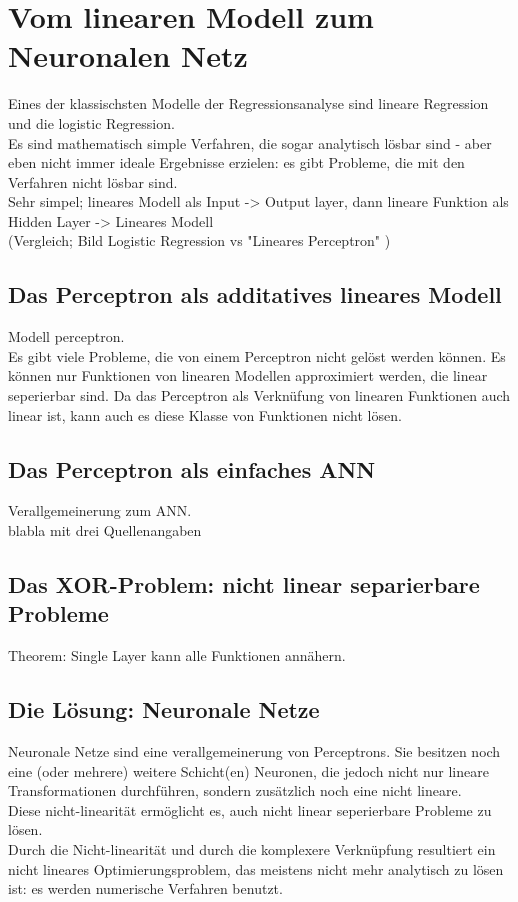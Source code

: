﻿\section{Vom linearen Modell zum Neuronalen Netz}
Eines der klassischsten Modelle der Regressionsanalyse sind lineare Regression und die logistic Regression. \\

Es sind mathematisch simple Verfahren, die sogar analytisch lösbar sind - aber eben nicht immer ideale Ergebnisse erzielen: es gibt Probleme, die mit den Verfahren nicht lösbar sind. 
\\


Sehr simpel; lineares Modell als Input -> Output layer,
dann lineare Funktion als Hidden Layer -> Lineares Modell \\
(Vergleich; Bild Logistic Regression vs "Lineares Perceptron" )

\subsection{Das Perceptron als additatives lineares Modell}

Modell perceptron. \\

Es gibt viele Probleme, die von einem Perceptron nicht gelöst werden können. Es können nur Funktionen von linearen Modellen approximiert werden, die linear seperierbar sind. Da das Perceptron als Verknüfung von linearen Funktionen auch linear ist, kann auch es diese Klasse von Funktionen nicht lösen.

\subsection{Das Perceptron als einfaches ANN}

Verallgemeinerung zum ANN. \\
blabla mit drei Quellenangaben\cite{ietf-ipfix-protocol,snoeren2001hash,belenky2003ip}

\subsection{Das XOR-Problem: nicht linear separierbare Probleme}
Theorem: Single Layer kann alle Funktionen annähern.

\subsection{Die Lösung: Neuronale Netze}
Neuronale Netze sind eine verallgemeinerung von Perceptrons. Sie besitzen noch eine (oder mehrere) weitere Schicht(en) Neuronen, die jedoch nicht nur lineare Transformationen durchführen, sondern zusätzlich noch eine nicht lineare. \\

Diese nicht-linearität ermöglicht es, auch nicht linear seperierbare Probleme zu lösen.\\

Durch die Nicht-linearität und durch die komplexere Verknüpfung resultiert ein nicht lineares Optimierungsproblem, das meistens nicht mehr analytisch zu lösen ist: es werden numerische Verfahren benutzt.


